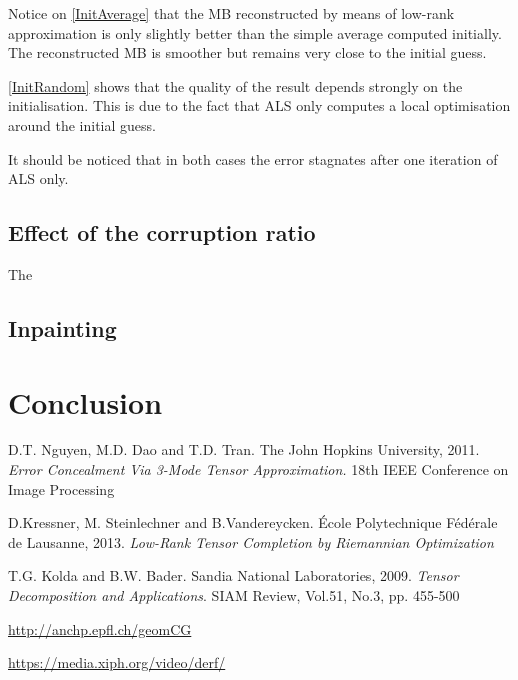 \documentclass[a4paper, 11pt]{article} %
\begin{document}
Notice on \autoref{InitAverage} that the MB reconstructed by means of low-rank approximation is only slightly better than the simple average computed initially. The reconstructed MB is smoother but remains very close to the initial guess.

\autoref{InitRandom} shows that the quality of the result depends strongly on the initialisation. This is due to the fact that ALS only computes a local optimisation around the initial guess.

It should be noticed that in both cases the error stagnates after one iteration of ALS only.

\subsection{Effect of the corruption ratio}

The 

\subsection{Inpainting}

\section{Conclusion}

\begin{thebibliography}{9}

D.T. Nguyen, M.D. Dao and T.D. Tran. {The John Hopkins University}, 2011.
\textit{Error Concealment Via 3-Mode Tensor Approximation.} 18th IEEE Conference on Image Processing


D.Kressner, M. Steinlechner and B.Vandereycken.{ \'Ecole Polytechnique F\'ed\'erale de Lausanne}, 2013. \textit{Low-Rank Tensor Completion by Riemannian Optimization}


  T.G. Kolda and B.W. Bader. {Sandia National Laboratories}, 2009.
\textit{Tensor Decomposition and Applications}. SIAM Review, Vol.51, No.3, pp. 455-500

 \url{http://anchp.epfl.ch/geomCG}

 \url{https://media.xiph.org/video/derf/}
\end{thebibliography}
\end{document}
